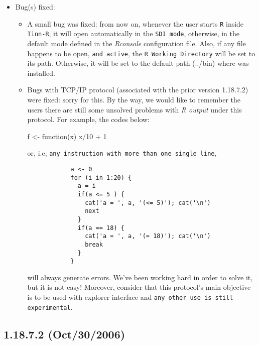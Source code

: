 \begin{itemize}
  \item Bug(s) fixed:
    \begin{itemize}
      \item A small bug was fixed: from now on, whenever the user starts
        \texttt{R} inside \texttt{Tinn-R}, it will open automatically
        in the \texttt{SDI mode}, otherwise, in the default mode defined
        in the \textit{Rconsole} configuration file. Also, if any file
        happens to be open, \texttt{and active}, the \texttt{R Working
          Directory} will be set to its path. Otherwise, it will be set to
        the default path (../bin) where \RR{} was installed.
      \item Bugs with TCP/IP protocol (associated with the prior version
        1.18.7.2) were fixed: sorry for this. By the way, we would like
        to remember the users there are still some unsolved problems
        with \textit{R output} under this protocol. For example, the
        codes below:

        \begin{Scode}
          f <- function(x) {
            x/10 + 1
          }
        \end{Scode}

        or, i.e, \texttt{any instruction with more than one single line},

        \begin{footnotesize}
          \begin{verbatim}
            a <- 0
            for (i in 1:20) {
              a = i
              if(a <= 5 ) {
                cat('a = ', a, '(<= 5)'); cat('\n')
                next
              }
              if(a == 18) {
                cat('a = ', a, '(= 18)'); cat('\n')
                break
              }
            }
          \end{verbatim}
        \end{footnotesize}

        will always generate errors. We've been working hard in order to solve it,
        but it is not easy!
        Moreover, consider that this protocol's main objective is to be used with \RR{}
        explorer interface and \texttt{any other use is still experimental}.
    \end{itemize}
\end{itemize}


\subsection{1.18.7.2 (Oct/30/2006)}

